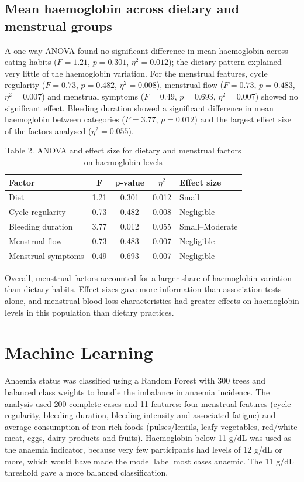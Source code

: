 \documentclass{article}
\begin{document}
\subsection{Mean haemoglobin across dietary and menstrual groups}
A one-way ANOVA found no significant difference in mean haemoglobin across eating habits ($F = 1.21$, $p = 0.301$, $\eta^2 = 0.012$); the dietary pattern explained very little of the haemoglobin variation. For the menstrual features, cycle regularity ($F = 0.73$, $p = 0.482$, $\eta^2 = 0.008$), menstrual flow ($F = 0.73$, $p = 0.483$, $\eta^2 = 0.007$) and menstrual symptoms ($F = 0.49$, $p = 0.693$, $\eta^2 = 0.007$) showed no significant effect. Bleeding duration showed a significant difference in mean haemoglobin between categories ($F = 3.77$, $p = 0.012$) and the largest effect size of the factors analysed ($\eta^2 = 0.055$).

\begin{table}
\caption{Table 2. ANOVA and effect size for dietary and menstrual factors on haemoglobin levels}
\begin{tabular}{|l|c|c|c|l|}
\hline
Factor & F & p-value & $\eta^2$ & Effect size \\
\hline
Diet & 1.21 & 0.301 & 0.012 & Small \\
Cycle regularity & 0.73 & 0.482 & 0.008 & Negligible \\
Bleeding duration & 3.77 & 0.012 & 0.055 & Small--Moderate \\
Menstrual flow & 0.73 & 0.483 & 0.007 & Negligible \\
Menstrual symptoms & 0.49 & 0.693 & 0.007 & Negligible \\
\hline
\end{tabular}
\end{table}

Overall, menstrual factors accounted for a larger share of haemoglobin variation than dietary habits. Effect sizes gave more information than association tests alone, and menstrual blood loss characteristics had greater effects on haemoglobin levels in this population than dietary practices.

\section{Machine Learning}
Anaemia status was classified using a Random Forest with 300 trees and balanced class weights to handle the imbalance in anaemia incidence. The analysis used 200 complete cases and 11 features: four menstrual features (cycle regularity, bleeding duration, bleeding intensity and associated fatigue) and average consumption of iron-rich foods (pulses/lentils, leafy vegetables, red/white meat, eggs, dairy products and fruits). Haemoglobin below 11 g/dL was used as the anaemia indicator, because very few participants had levels of 12 g/dL or more, which would have made the model label most cases anaemic. The 11 g/dL threshold gave a more balanced classification.
\end{document}
